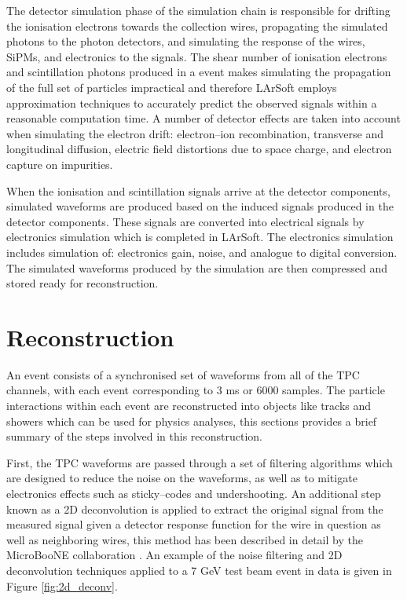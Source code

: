 The detector simulation phase of the simulation chain is responsible for
drifting the ionisation electrons towards the collection wires, propagating the
simulated photons to the photon detectors, and simulating the response of the
wires, SiPMs, and electronics to the signals. The shear number of ionisation 
electrons and scintillation photons produced in a \protodune{} event makes 
simulating the propagation of the full set of particles impractical and 
therefore LArSoft employs approximation techniques to accurately predict the 
observed signals within a reasonable computation time. A number of detector 
effects are taken into account when simulating the electron drift: 
electron--ion recombination, transverse and longitudinal diffusion, electric 
field distortions due to space charge, and electron capture on impurities. 

When the ionisation and scintillation signals arrive at the detector components,
simulated waveforms are produced based on the induced signals produced in the
detector components. These signals are converted into electrical signals
by electronics simulation which is completed in LArSoft. The electronics 
simulation includes simulation of: electronics gain, noise, and analogue to 
digital conversion. The simulated waveforms produced by the \protodune{} 
simulation are then compressed and stored ready for reconstruction.

\section{Reconstruction} \label{sec:reconstruction}


An event consists of a synchronised set of waveforms from all of the TPC 
channels, with each event corresponding to 3 ms or 6000 samples. The particle
interactions within each event are reconstructed into objects like tracks and
showers which can be used for physics analyses, this sections provides a brief 
summary of the steps involved in this reconstruction.

First, the TPC waveforms are passed through a set of filtering algorithms which
are designed to reduce the noise on the waveforms, as well as to mitigate 
electronics effects such as sticky--codes and undershooting. An additional step
known as a 2D deconvolution is applied to extract the original signal from the
measured signal given a detector response function for the wire in question as
well as neighboring wires, this method has been described in detail by the 
MicroBooNE collaboration \cite{Adams:2018dra}. An example of the noise filtering
and 2D deconvolution techniques applied to a 7 GeV test beam event in 
\protodune{} data is given in Figure \ref{fig:2d_deconv}.


